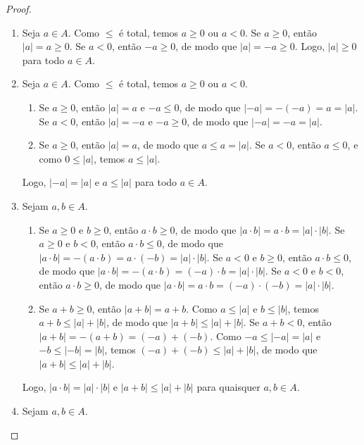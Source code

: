 \begin{proof}
    \leavevmode
        \begin{enumerate}[leftmargin=*, align=left, label=\textbf{(\alph*)}]
            \item Seja $a \in A$. Como $\leq$ é total, temos $a \geq 0$ ou $a < 0$. Se $a \geq 0$, então $|a| = a \geq 0$. Se $a < 0$, então $-a \geq 0$, de modo que $|a| = -a \geq 0$. Logo, $|a| \geq 0$ para todo $a \in A$. \blackproof
            \item Seja $a \in A$. Como $\leq$ é total, temos $a \geq 0$ ou $a < 0$.
                \begin{enumerate}[label=\roman*.]
                    \item Se $a \geq 0$, então $|a| = a$ e $-a \leq 0$, de modo que $|-a| = -(-a) = a = |a|$. Se $a < 0$, então $|a| = -a$ e $-a \geq 0$, de modo que $|-a| = -a = |a|$.
                    \item Se $a \geq 0$, então $|a| = a$, de modo que $a \leq a = |a|$. Se $a < 0$, então $a \leq 0$, e como $0 \leq |a|$, temos $a \leq |a|$.
                \end{enumerate}
             Logo, $|-a| = |a|$ e $a \leq |a|$ para todo $a \in A$. \blackproof
            \item Sejam $a,b \in A$.
                \begin{enumerate}[label=\roman*.]
                    \item Se $a \geq 0$ e $b \geq 0$, então $a \cdot b \geq 0$, de modo que $|a \cdot b| = a \cdot b = |a| \cdot |b|$. Se $a \geq 0$ e $b < 0$, então $a \cdot b \leq 0$, de modo que $|a \cdot b| = -(a \cdot b) = a \cdot (-b) = |a| \cdot |b|$. Se $a < 0$ e $b \geq 0$, então $a \cdot b \leq 0$, de modo que $|a \cdot b| = -(a \cdot b) = (-a) \cdot b = |a| \cdot |b|$. Se $a < 0$ e $b < 0$, então $a \cdot b \geq 0$, de modo que $|a \cdot b| = a \cdot b = (-a) \cdot (-b) = |a| \cdot |b|$.
                    \item Se $a+b \geq 0$, então $|a+b| = a+b$. Como $a \leq |a|$ e $b \leq |b|$, temos $a+b \leq |a| + |b|$, de modo que $|a+b| \leq |a| + |b|$. Se $a+b < 0$, então $|a+b| = -(a+b) = (-a) + (-b)$. Como $-a \leq |-a| = |a|$ e $-b \leq |-b| = |b|$, temos $(-a) + (-b) \leq |a| + |b|$, de modo que $|a+b| \leq |a| + |b|$.
                \end{enumerate}
            Logo, $|a \cdot b| = |a| \cdot |b|$ e $|a + b| \leq |a| + |b|$ para quaisquer $a,b \in A$. \blackproof
            \item Sejam $a,b \in A$.

\end{enumerate}
\end{proof}
